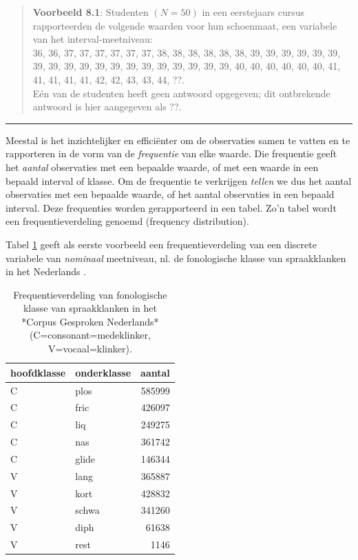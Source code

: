 \documentclass[
]{book}
\begin{document}
\begin{quote}
\textbf{Voorbeeld 8.1}: Studenten \((N=50)\) in een eerstejaars
cursus rapporteerden de volgende waarden voor hun schoenmaat, een
variabele van het interval-meetniveau:\\
36, 36, 37, 37, 37, 37, 37, 37, 38, 38, 38, 38, 38, 38, 39, 39, 39, 39,
39, 39, 39, 39, 39, 39, 39, 39, 39, 39, 39, 39, 39, 39, 39, 40, 40, 40,
40, 40, 40, 41, 41, 41, 41, 41, 42, 42, 43, 43, 44, ??.\\
Eén van de studenten heeft geen antwoord opgegeven; dit ontbrekende
antwoord is hier aangegeven als ??.
\end{quote}

\begin{center}\rule{0.5\linewidth}{0.5pt}\end{center}

Meestal is het inzichtelijker en efficiënter om de observaties samen te
vatten en te rapporteren in de vorm van de \emph{frequentie} van elke waarde.
Die frequentie geeft het \emph{aantal} observaties met een bepaalde waarde,
of met een waarde in een bepaald interval of klasse. Om de frequentie te
verkrijgen \emph{tellen} we dus het aantal observaties met een bepaalde
waarde, of het aantal observaties in een bepaald interval. Deze
frequenties worden gerapporteerd in een tabel. Zo'n tabel wordt een
frequentieverdeling genoemd (frequency distribution).

Tabel \ref{tab:klankfreq} geeft als eerste voorbeeld een
frequentieverdeling van een discrete variabele van \emph{nominaal}
meetniveau, nl. de fonologische klasse van spraakklanken in het
Nederlands \citep{LKCG07}.

\begin{table}[t]

\caption{\label{tab:klankfreq}Frequentieverdeling 
              van fonologische klasse van spraakklanken 
              in het *Corpus Gesproken Nederlands* 
              (C=consonant=medeklinker, V=vocaal=klinker).}
\centering
\begin{tabular}{llr}
\toprule
hoofdklasse & onderklasse & aantal\\
\midrule
C & plos & 585999\\
C & fric & 426097\\
C & liq & 249275\\
C & nas & 361742\\
C & glide & 146344\\
\addlinespace
V & lang & 365887\\
V & kort & 428832\\
V & schwa & 341260\\
V & diph & 61638\\
V & rest & 1146\\
\bottomrule
\end{tabular}
\end{table}
\end{document}

